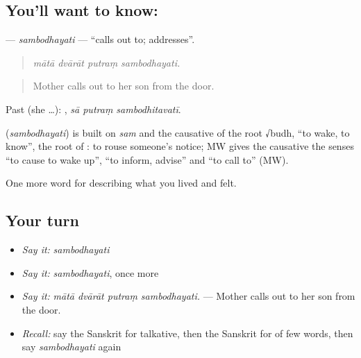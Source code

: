 \subsection*{You'll want to know: }
\textbf{} — \emph{sambodhayati} — \textquotedblleft{}calls out to; addresses\textquotedblright{}.

\begin{quote}
   
\end{quote}

\begin{quote}
\emph{mātā dvārāt putraṃ sambodhayati.}
\end{quote}

\begin{quote}
Mother calls out to her son from the door.
\end{quote}

Past (she …):   , \emph{sā putraṃ sambodhitavatī}.

\begin{cousinweb}
\textbf{} (\emph{sambodhayati}) is built on \emph{sam} and the causative of the root √budh, \textquotedblleft{}to wake, to know\textquotedblright{}, the root of \textbf{}: to rouse someone's notice; MW gives the causative the senses \textquotedblleft{}to cause to wake up\textquotedblright{}, \textquotedblleft{}to inform, advise\textquotedblright{} and \textquotedblleft{}to call to\textquotedblright{} (MW).
\end{cousinweb}

\begin{grammarlens}[title={What you've built}]
One more word for describing what you lived and felt.
\end{grammarlens}

\subsection*{Your turn}
\begin{itemize}
\raggedright
  \item \emph{Say it:} \emph{sambodhayati}
  \item \emph{Say it:} \emph{sambodhayati}, once more
  \item \emph{Say it:} \emph{mātā dvārāt putraṃ sambodhayati.} — Mother calls out to her son from the door.
  \item \emph{Recall:} say the Sanskrit for talkative, then the Sanskrit for of few words, then say \emph{sambodhayati} again
\end{itemize}


